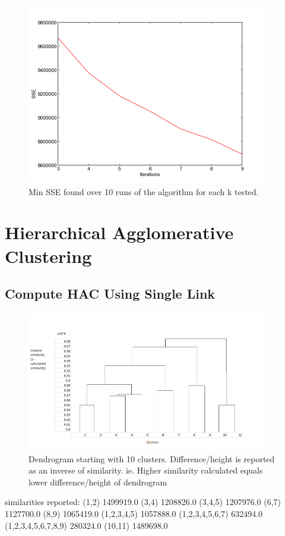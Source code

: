 \documentclass[letterpaper,10pt]{article}
\begin{document}
     \begin{figure}[ht]
    \centering
   \includegraphics[width=300pt]{diffks.png}
    \caption{Min SSE found over 10 runs of the algorithm for each k tested.}
    \label{fig:diffk}
    \end{figure}	


\section{Hierarchical Agglomerative Clustering}
\subsection{Compute HAC Using Single Link}
     \begin{figure}[ht]
    \centering
   \includegraphics[width=300pt]{dendroHAC.png}
    \caption{Dendrogram starting with 10 clusters. Difference/height is reported as an inverse of similarity. ie. Higher similarity calculated equals lower difference/height of dendrogram}
    \label{fig:diffk}
    \end{figure}	

	similarities reported: 
	(1,2) 1499919.0
	(3,4) 1208826.0
	(3,4,5) 1207976.0
	(6,7) 1127700.0
	(8,9) 1065419.0
	(1,2,3,4,5) 1057888.0
	(1,2,3,4,5,6,7) 632494.0
	(1,2,3,4,5,6,7,8,9) 280324.0
	(10,11) 1489698.0
\end{document}
